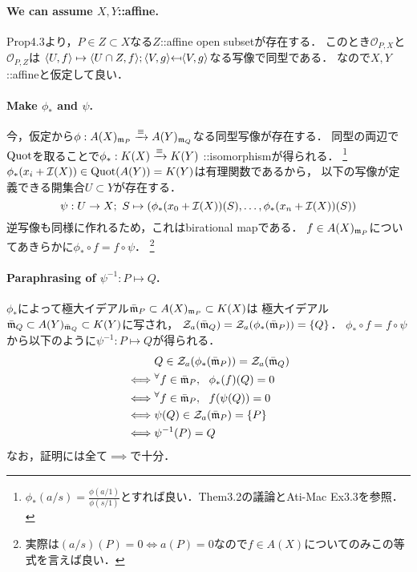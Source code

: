 \documentclass[a4paper]{jsarticle}
\begin{document}
    \paragraph{We can assume $X,Y$::affine.}
    Prop4.3より，$P \in Z \subset X$なる$Z$::affine open subsetが存在する．
    このとき$\mathcal{O}_{P,X}$と$\mathcal{O}_{P,Z}$は
    $\reg{U}{f} \mapsto \reg{U \cap Z}{f}; \reg{V}{g} \mapedfrom \reg{V}{g}$なる写像で同型である．
    なので$X,Y$::affineと仮定して良い．

    \paragraph{Make $\phi_{\ast}$ and $\psi$.}
    今，仮定から$\phi: A(X)_{\mathfrak{m}_P} \xrightarrow{\equiv} A(Y)_{\mathfrak{m}_Q}$なる同型写像が存在する．
    同型の両辺で$\operatorname{Quot}$を取ることで$\phi_{\ast}:K(X) \xrightarrow{\equiv} K(Y)$ ::isomorphismが得られる．
    \footnote{$\phi_{\ast}(a/s)=\frac{\phi(a/1)}{\phi(s/1)}$とすれば良い．Them3.2の議論とAti-Mac Ex3.3を参照．}
    $\phi_{\ast}(x_i+\mathcal{I}(X)) \in \operatorname{Quot}(A(Y))=K(Y)$は有理関数であるから，
    以下の写像が定義できる開集合$U \subset Y$が存在する．
    \[ \psi: U \to X;~ S \mapsto (\phi_{\ast}(x_0+\mathcal{I}(X))(S), \dots, \phi_{\ast}(x_n+\mathcal{I}(X))(S)) \]
    逆写像も同様に作れるため，これはbirational mapである．
    $f \in A(X)_{\mathfrak{m}_P}$についてあきらかに$\phi_{\ast} \circ f=f \circ \psi$．
    \footnote{実際は$(a/s)(P)=0 \iff a(P)=0$なので$f \in A(X)$についてのみこの等式を言えば良い．}

    \paragraph{Paraphrasing of $\psi^{-1}: P \mapsto Q$.}
    $\phi_{\ast}$によって極大イデアル$\bar{\mathfrak{m}}_P \subset A(X)_{\mathfrak{m}_P} \subset K(X)$は
    極大イデアル$\bar{\mathfrak{m}}_Q \subset A(Y)_{\bar{\mathfrak{m}}_Q} \subset K(Y)$に写され，
    $\mathcal{Z}_a(\bar{\mathfrak{m}}_Q)=\mathcal{Z}_a(\phi_{\ast}(\bar{\mathfrak{m}}_P))=\{Q\}$．
    $\phi_{\ast} \circ f=f \circ \psi$から以下のように$\psi^{-1}: P \mapsto Q$が得られる．
    \begin{align*}
        {}&     Q \in \mathcal{Z}_a(\phi_{\ast}(\bar{\mathfrak{m}}_P))=\mathcal{Z}_a(\bar{\mathfrak{m}}_Q) \\
        \iff&   {}^{\forall} f \in \bar{\mathfrak{m}}_P,~~ \phi_{\ast}(f)(Q)=0 \\
        \iff&   {}^{\forall} f \in \bar{\mathfrak{m}}_P,~~ f(\psi(Q))=0 \\
        \iff&   \psi(Q) \in \mathcal{Z}_a(\bar{\mathfrak{m}}_P)=\{P\} \\
        \iff&   \psi^{-1}(P)=Q
    \end{align*}
    なお，証明には全て$\implies$で十分．
\end{document}
